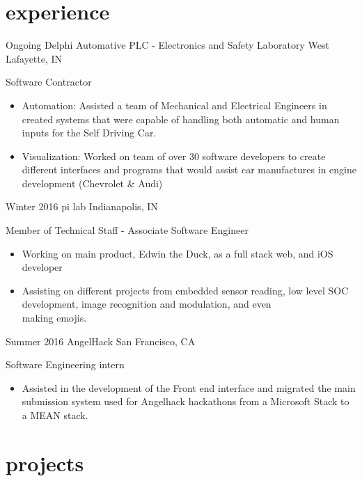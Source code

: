 \documentclass[]{friggeri-cv} %
\begin{document}
\section{experience}
\begin{entrylist}


\entry
{      Ongoing}
{Delphi Automative PLC - \normalfont Electronics and Safety Laboratory}
{West Lafayette, IN}
{Software Contractor
\begin{itemize}
\item Automation: Assisted a team of Mechanical and Electrical Engineers in created systems that were capable of handling both automatic and human inputs for the Self Driving Car.
\item Visualization: Worked on team of over 30 software developers to create different interfaces and programs that would assist car manufactures in engine development (Chevrolet & Audi)

\end{itemize}}
%
%
%
%
\entry
{      Winter 2016}
{pi lab}
{Indianapolis, IN}
{Member of Technical Staff - Associate Software Engineer
\begin{itemize}
\item Working on main product, Edwin the Duck, as a full stack web, and iOS developer
\item Assisting on different projects from embedded sensor reading, low level SOC development, image recognition and modulation, and even \\ making emojis.
\end{itemize}}
\entry
{Summer 2016}
{AngelHack}
{San Francisco, CA}
{Software Engineering intern
\begin{itemize}
\item Assisted in the development of the Front end interface and migrated the main \\submission system used for Angelhack hackathons from a Microsoft Stack to a MEAN stack.
\end{itemize}}
\end{entrylist}
\vspace{-10pt}

\section{projects}
\end{document}
